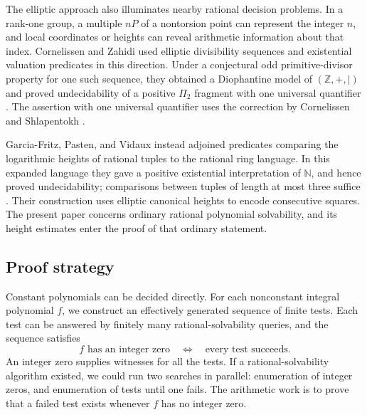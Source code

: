 The elliptic approach also illuminates nearby rational decision
problems.  In a rank-one group, a multiple \(nP\) of a nontorsion
point can represent the integer \(n\), and local coordinates or heights can reveal arithmetic
information about that index.  Cornelissen and Zahidi used elliptic
divisibility sequences and existential valuation predicates in this
direction.  Under a conjectural odd primitive-divisor property for one
such sequence, they obtained a Diophantine model of
\((\mathbb Z,+,\mid)\) and proved undecidability of a positive
\(\Pi_2\) fragment with one universal quantifier
\cite[Conjecture~3.16 and Theorems~3.17 and~5.3]{CornelissenZahidi2007}.
The assertion with one universal quantifier uses the correction by
Cornelissen and Shlapentokh
\cite[Remark~2.3 in the author version]{CornelissenShlapentokh2009}.


Garcia-Fritz, Pasten, and Vidaux instead adjoined predicates comparing
the logarithmic heights of rational tuples to the rational ring
language.  In this expanded language they gave a
positive existential interpretation of \(\mathbb N\), and hence
proved undecidability; comparisons between tuples of length at most
three suffice \cite[Theorems~1.1--1.2]{GarciaFritzPastenVidaux2025}.
Their construction uses elliptic canonical heights to encode
consecutive squares.  The present paper concerns ordinary rational
polynomial solvability, and its height estimates enter the proof of
that ordinary statement.

\subsection{Proof strategy}

Constant polynomials can be decided directly. For each nonconstant integral
polynomial \(f\), we construct an effectively generated sequence of finite tests.
Each test can be answered by finitely many rational-solvability queries, and the sequence satisfies
\begin{equation}\label{intro:finite-test-interface}
 f\text{ has an integer zero}
 \quad\Longleftrightarrow\quad
 \text{every test succeeds}.
\end{equation}
An integer zero supplies witnesses for all the tests. If a rational-solvability algorithm existed, we could run two searches in parallel: enumeration of integer zeros, and enumeration of tests until one fails. The arithmetic work is to prove that a failed test exists whenever \(f\) has no integer zero.

